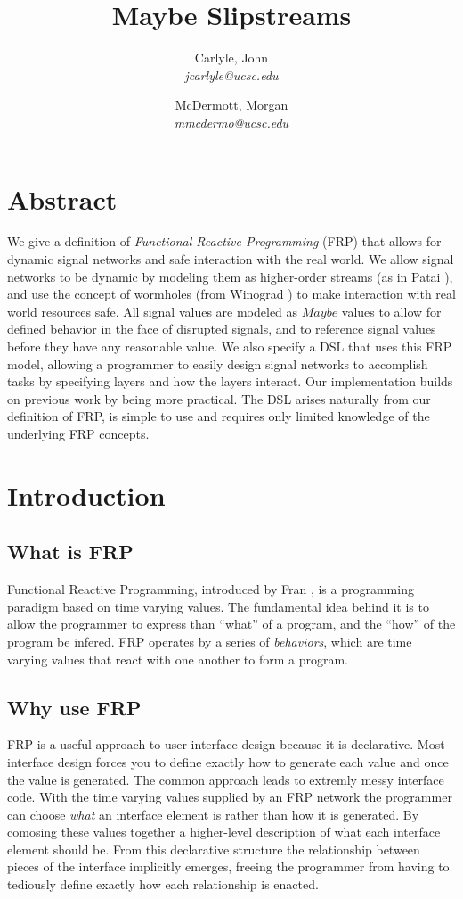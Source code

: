 \documentclass[twocolumn,11pt,english]{article}
\title{Maybe Slipstreams}
\date{}
\author{
  Carlyle, John\\
  \textit{jcarlyle@ucsc.edu}
  \and
  McDermott, Morgan\\
  \textit{mmcdermo@ucsc.edu}
}
\begin{document}
\maketitle

\section*{Abstract}
We give a definition of \textit{Functional Reactive Programming} (FRP) that allows for dynamic signal networks and safe interaction with the real world. We allow signal networks to be dynamic by modeling them as higher-order streams (as in Patai \cite{HighOrderStreams}), and use the concept of wormholes (from Winograd \cite{WinogradCort2012HS}) to make interaction with real world resources safe. All signal values are modeled as $Maybe$ values to allow for defined behavior in the face of disrupted signals, and to reference signal values before they have any reasonable value. We also specify a DSL that uses this FRP model, allowing a programmer to easily design signal networks to accomplish tasks by specifying layers and how the layers interact. Our implementation builds on previous work by being more practical. The DSL arises naturally from our definition of FRP, is simple to use and requires only limited knowledge of the underlying FRP concepts.

\section{Introduction}
\subsection{What is FRP}
Functional Reactive Programming, introduced by Fran \cite{ElliottHudak97:Fran}, is a programming paradigm based on time varying values. The fundamental idea behind it is to allow the programmer to express than ``what'' of a program, and the ``how'' of the program be infered. FRP operates by a series of \textit{behaviors}, which are time varying values that react with one another to form a program. 

\subsection{Why use FRP}
FRP is a useful approach to user interface design because it is declarative. Most interface design forces you to define exactly how to generate each value and once the value is generated. The common approach leads to extremly messy interface code. With the time varying values supplied by an FRP network the programmer can choose \textit{what} an interface element is rather than how it is generated. By comosing these values together a higher-level description of what each interface element should be. From this declarative structure the relationship between pieces of the interface implicitly emerges, freeing the programmer from having to tediously define exactly how each relationship is enacted.
\end{document}

